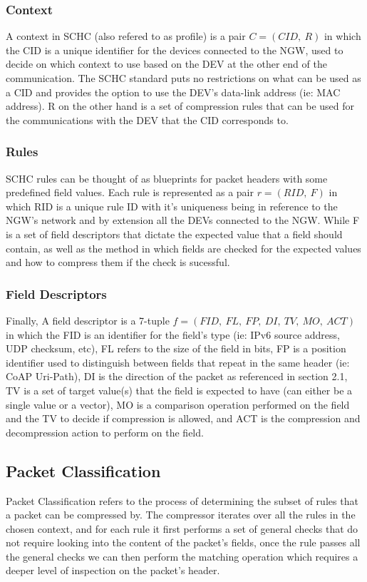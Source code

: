 \documentclass[12pt]{dalthesis}
\begin{document}
	\subsubsection{Context}
	A context in SCHC (also refered to as profile) is a pair $C = (CID, \ R)$ in which the CID is a unique identifier for the 
	devices connected to the NGW, used to decide on which context to use based on the DEV at the other end of the communication. The SCHC standard 
	puts no restrictions on what can be used as a CID and provides the option to use the DEV's data-link address (ie: MAC address). R on the other hand
	is a set of compression rules that can be used for the communications with the DEV that the CID corresponds to. 

	\subsubsection{Rules}
	SCHC rules can be thought of as blueprints for packet headers with some predefined field values. Each rule is represented as a pair $r = (RID, \ F)$ in which RID is a unique rule ID with it's uniqueness being
	in reference to the NGW's network and by extension all the DEVs connected to the NGW. While F is a set of field descriptors that dictate the expected 
	value that a field should contain, as well as the method in which fields are checked for the expected values and how to compress
	them if the check is sucessful.

	\subsubsection{Field Descriptors}
	Finally, A field descriptor is a 7-tuple $f= (FID, \ FL, \ FP, \ DI, \ TV, \ MO, \ ACT)$ in which the FID is an identifier for the 
	field's type (ie: IPv6 source address, UDP checksum, etc), FL refers to the size of the field in bits, FP is a position identifier used to
	distinguish between fields that repeat in the same header (ie: CoAP Uri-Path), DI is the direction of the packet as referenced in 
	section 2.1, TV is a set of target value(s) that the field is expected to have (can either be a single value or a vector), MO is a comparison operation performed
	on the field and the TV to decide if compression is allowed, and ACT is the compression and decompression action to perform on the field.


	\subsection{Packet Classification}
	Packet Classification refers to the process of determining the subset of rules that a packet can be compressed by. The compressor
	iterates over all the rules in the chosen context, and for each rule it 
	first performs a set of general checks that do not require looking into the content of the packet's fields, once the rule passes all
	the general checks we can then perform the matching operation which requires a deeper level of inspection on the packet's header.	
\end{document}

